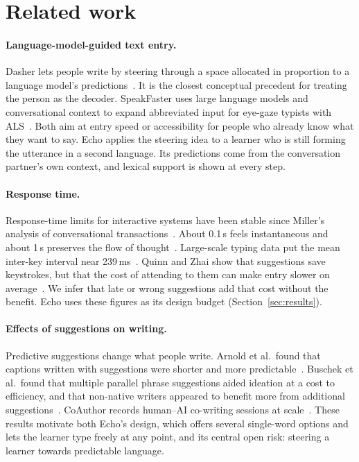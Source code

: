 \documentclass[11pt,a4paper]{article}
\begin{document}
\section{Related work}
\label{sec:related}
\paragraph{Language-model-guided text entry.} Dasher lets people write by steering through a space allocated in proportion to a language model's predictions~\cite{dasher}. It is the closest conceptual precedent for treating the person as the decoder. SpeakFaster uses large language models and conversational context to expand abbreviated input for eye-gaze typists with ALS~\cite{speakfaster}. Both aim at entry speed or accessibility for people who already know what they want to say. Echo applies the steering idea to a learner who is still forming the utterance in a second language. Its predictions come from the conversation partner's own context, and lexical support is shown at every step.

\paragraph{Response time.} Response-time limits for interactive systems have been stable since Miller's analysis of conversational transactions~\cite{miller}. About 0.1\,s feels instantaneous and about 1\,s preserves the flow of thought~\cite{card,nielsen}. Large-scale typing data put the mean inter-key interval near 239\,ms~\cite{dhakal}. Quinn and Zhai show that suggestions save keystrokes, but that the cost of attending to them can make entry slower on average~\cite{quinn}. We infer that late or wrong suggestions add that cost without the benefit. Echo uses these figures as its design budget (Section~\ref{sec:results}).

\paragraph{Effects of suggestions on writing.} Predictive suggestions change what people write. Arnold et al.\ found that captions written with suggestions were shorter and more predictable~\cite{predictable}. Buschek et al.\ found that multiple parallel phrase suggestions aided ideation at a cost to efficiency, and that non-native writers appeared to benefit more from additional suggestions~\cite{parallel}. CoAuthor records human--AI co-writing sessions at scale~\cite{coauthor}. These results motivate both Echo's design, which offers several single-word options and lets the learner type freely at any point, and its central open risk: steering a learner towards predictable language.
\end{document}
